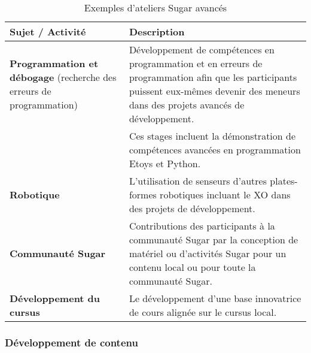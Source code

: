 \documentclass[12pt]{article}
\begin{document}
\begin{table}[htb]
\caption{Exemples d'ateliers Sugar avancés} 
\begin{center}
\begin{tabular}{|p{3.8cm}|p{11cm}|}
\hline
 Sujet / Activité                                                             &  Description                                                                                                                                                                               \\
\hline
 \textbf{Programmation et débogage} (recherche des erreurs de programmation)  &  Développement de compétences en programmation et en erreurs de programmation afin que les participants puissent eux-mêmes devenir des meneurs dans des projets avancés de développement.  \\
                                                                              &  Ces stages incluent la démonstration de compétences avancées en programmation Etoys et Python.                                                                                            \\
\hline
 \textbf{Robotique}                                                           &  L’utilisation de senseurs d’autres plates-formes robotiques incluant le XO dans des projets de développement.                                                                             \\
\hline
 \textbf{Communauté Sugar}                                                    &  Contributions des participants à la communauté Sugar par la conception de matériel ou d’activités Sugar pour un contenu local ou pour toute la communauté Sugar.                          \\
\hline
 \textbf{Développement du cursus}                                             &  Le développement d’une base innovatrice de cours alignée sur le cursus local.                                                                                                             \\
\hline
\end{tabular}
\end{center}
\end{table}
\subsubsection{Développement de contenu}
\label{sec-9-2-2}


\end{document}
